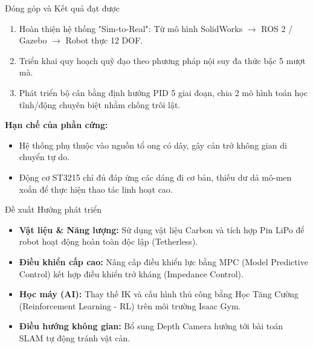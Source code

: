 \documentclass[10pt,aspectratio=169]{beamer}
\begin{document}
\begin{frame}{Đóng góp và Kết quả đạt được}
  \begin{enumerate}
      \item Hoàn thiện hệ thống "Sim-to-Real": Từ mô hình SolidWorks $\rightarrow$ ROS 2 / Gazebo $\rightarrow$ Robot thực 12 DOF.
      \item Triển khai quy hoạch quỹ đạo theo phương pháp nội suy đa thức bậc 5 mượt mà.
      \item Phát triển bộ cân bằng định hướng PID 5 giai đoạn, chia 2 mô hình toán học tĩnh/động chuyên biệt nhằm chống trôi lật.
  \end{enumerate}
  \vspace{0.3cm}
  \textbf{Hạn chế của phần cứng:}
  \begin{itemize}
      \item Hệ thống phụ thuộc vào nguồn tổ ong có dây, gây cản trở không gian di chuyển tự do.
      \item Động cơ ST3215 chỉ đủ đáp ứng các dáng đi cơ bản, thiếu dư dả mô-men xoắn để thực hiện thao tác linh hoạt cao.
  \end{itemize}
\end{frame}

\begin{frame}{Đề xuất Hướng phát triển}
  \begin{itemize}
      \item \textbf{Vật liệu \& Năng lượng:} Sử dụng vật liệu Carbon và tích hợp Pin LiPo để robot hoạt động hoàn toàn độc lập (Tetherless).
      \item \textbf{Điều khiển cấp cao:} Nâng cấp điều khiển lực bằng MPC (Model Predictive Control) kết hợp điều khiển trở kháng (Impedance Control).
      \item \textbf{Học máy (AI):} Thay thế IK và cấu hình thủ công bằng Học Tăng Cường (Reinforcement Learning - RL) trên môi trường Isaac Gym.
      \item \textbf{Điều hướng không gian:} Bổ sung Depth Camera hướng tới bài toán SLAM tự động tránh vật cản.
  \end{itemize}
\end{frame}
\end{document}
